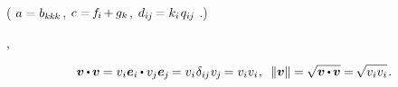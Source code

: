 {\begin{leftverticalbar}
\vspace{-1em}
(
${a \mathcolor{black!50}{=} b_{k\hspace{-0.1ex}k\hspace{-0.1ex}k} \hspace{.1ex}}$,
${c \mathcolor{black!50}{=} \hspace{-0.2ex} f_{\hspace{-0.1ex}i} \hspace{-0.2ex} + \hspace{-0.1ex} g_k \hspace{.1ex}}$,
${d_{i\hspace{-0.1ex}j} \hspace{-0.2ex} \mathcolor{black!50}{=} k_i \hspace{.2ex} q_{i\hspace{-0.1ex}j}}$
.)
\end{leftverticalbar}
\par}

  ,

\nopagebreak\vspace{-0.15em}
\begin{equation}\label{vectorlength}
\bm{v} \hspace{-0.1ex} \dotp \hspace{-0.1ex} \bm{v} \hspace{-0.1ex}
= v_i \bm{e}_i \hspace{-0.1ex} \dotp v_{\hspace{-0.1ex}j} \bm{e}_{\hspace{-0.1ex}j} \hspace{-0.2ex}
= v_i \hspace{.1ex} \KroneckerDelta{i\hspace{-0.1ex}j} \hspace{.1ex} v_{\hspace{-0.1ex}j} \hspace{-0.2ex}
= v_i v_i
\hspace{.1ex} , \hspace{.5em}
\| \bm{v} \| \hspace{-0.1ex}
= \hspace{-0.1ex} \sqrt{\bm{v} \hspace{-0.1ex} \dotp \hspace{-0.1ex} \bm{v}} \hspace{-0.1ex}
= \hspace{-0.2ex} \sqrt{\vphantom{i} v_i v_i}
\hspace{.2ex} .
\end{equation}

